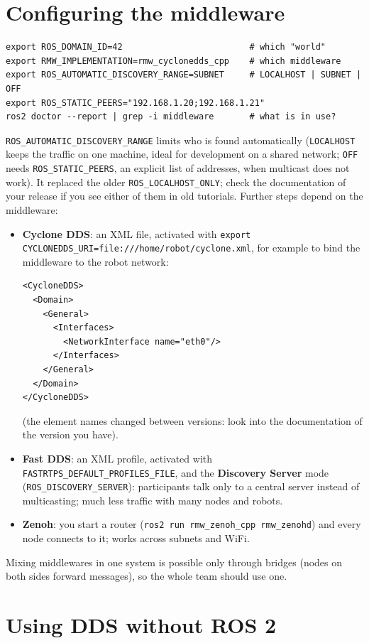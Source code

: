 \section*{Configuring the middleware}
\begin{verbatim}
export ROS_DOMAIN_ID=42                         # which "world"
export RMW_IMPLEMENTATION=rmw_cyclonedds_cpp    # which middleware
export ROS_AUTOMATIC_DISCOVERY_RANGE=SUBNET     # LOCALHOST | SUBNET | OFF
export ROS_STATIC_PEERS="192.168.1.20;192.168.1.21"
ros2 doctor --report | grep -i middleware       # what is in use?
\end{verbatim}
\verb!ROS_AUTOMATIC_DISCOVERY_RANGE! limits who is found automatically (\verb!LOCALHOST! keeps the traffic on one machine, ideal for development on a shared network; \verb!OFF! needs \verb!ROS_STATIC_PEERS!, an explicit list of addresses, when multicast does not work). It replaced the older \verb!ROS_LOCALHOST_ONLY!; check the documentation of your release if you see either of them in old tutorials. Further steps depend on the middleware:
\begin{itemize}[nosep]
\item \textbf{Cyclone DDS}: an XML file, activated with \verb!export CYCLONEDDS_URI=file:///home/robot/cyclone.xml!, for example to bind the middleware to the robot network:
\begin{verbatim}
<CycloneDDS>
  <Domain>
    <General>
      <Interfaces>
        <NetworkInterface name="eth0"/>
      </Interfaces>
    </General>
  </Domain>
</CycloneDDS>
\end{verbatim}
(the element names changed between versions: look into the documentation of the version you have).
\item \textbf{Fast DDS}: an XML profile, activated with \verb!FASTRTPS_DEFAULT_PROFILES_FILE!, and the \textbf{Discovery Server} mode (\verb!ROS_DISCOVERY_SERVER!): participants talk only to a central server instead of multicasting; much less traffic with many nodes and robots.
\item \textbf{Zenoh}: you start a router (\verb!ros2 run rmw_zenoh_cpp rmw_zenohd!) and every node connects to it; works across subnets and WiFi.
\end{itemize}
Mixing middlewares in one system is possible only through bridges (nodes on both sides forward messages), so the whole team should use one.

\section*{Using DDS without ROS 2}
